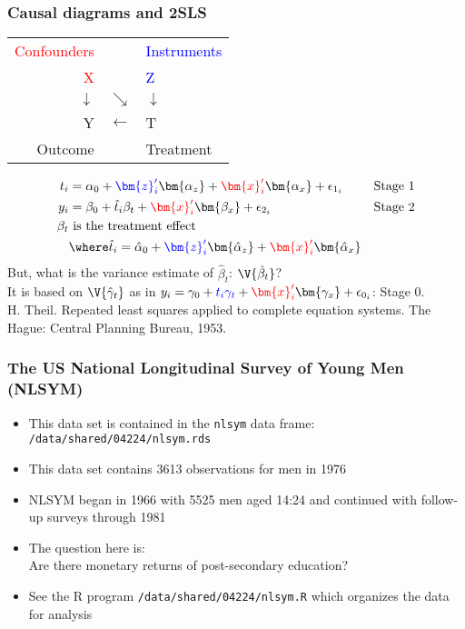 \documentclass[11pt,pdftex,dvipsnames,usenames,helvetica]{beamer}
\begin{document}
\begin{frame}[fragile]
\frametitle{Causal diagrams and 2SLS}
\begin{center}
\begin{tabular}{rcl}
\textcolor{red}{Confounders}  & & \textcolor{blue}{Instruments} \\
\textcolor{red}{X}            & & \textcolor{blue}{Z} \\
$\downarrow$ & $\searrow$ & $\downarrow$ \\
Y            & $\leftarrow$ & T \\
Outcome      & & Treatment
\end{tabular}
\end{center}
\begin{align*}
t_i & = \alpha_0 + \textcolor{blue}{\bm{z}_i'}\bm{\alpha_z}+
\textcolor{red}{\bm{x}_i'}\bm{\alpha_x}+\epsilon_{1_i} & \mbox{Stage 1} \\
 y_i & = \beta_0 + \hat{t}_i \beta_t+ \textcolor{red}{\bm{x}_i'}\bm{\beta_x}+
\epsilon_{2_i} & \mbox{Stage 2} \\
\beta_t & \mbox{\ is the treatment effect} \\
& \where  \hat{t}_i = \hat{\alpha}_0 + 
\textcolor{blue}{\bm{z}_i'}\bm{\hat{\alpha}_z}+
\textcolor{red}{\bm{x}_i'}\bm{\hat{\alpha}_x}
\end{align*}
But, what is the variance estimate of ${\hat{\beta}_t}$:
$\V{\hat{\beta}_t}$?\\
It is based on $\V{\hat{\gamma}_t}$ as in
$y_i = \gamma_0 + \textcolor{blue}{{t}_i \gamma_t}+
\textcolor{red}{\bm{x}_i'}\bm{\gamma_x}+
\epsilon_{0_i}$: Stage 0.\\
H. Theil. Repeated least squares applied to complete equation
systems. The Hague: Central Planning Bureau, 1953.
\end{frame}

\begin{frame}[fragile]
\frametitle{The US National Longitudinal Survey of Young Men
     (NLSYM)}

\begin{itemize}
\item This data set is contained in the {\tt nlsym} data frame:
{\tt /data/shared/04224/nlsym.rds}
\item This data set contains 3613 observations for men in 1976
\item NLSYM began in 1966 with 5525 men aged 14:24 and
     continued with follow-up surveys through 1981
\item The question here is:\\
Are there monetary returns of post-secondary education?
\item See the R program {\tt /data/shared/04224/nlsym.R}
which organizes the data for analysis
\end{itemize}
\end{frame}
\end{document}
